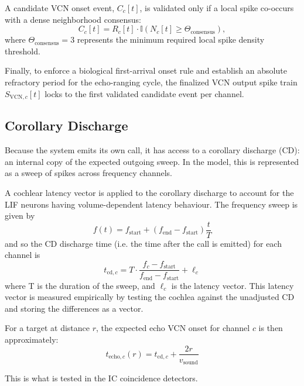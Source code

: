 A candidate VCN onset event, $C_c[t]$, is validated only if a local spike co-occurs with a dense neighborhood consensus:
\begin{equation}
    C_c[t] = R_c[t] \cdot \mathbb{I}\left(N_c[t] \geq \Theta_{\text{consensus}}\right),
\end{equation}
where $\Theta_{\text{consensus}} = 3$ represents the minimum required local spike density threshold.

Finally, to enforce a biological first-arrival onset rule and establish an absolute refractory period for the echo-ranging cycle, the finalized VCN output spike train $S_{\text{VCN}, c}[t]$ locks to the first validated candidate event per channel. 






\subsection{Corollary Discharge}

Because the system emits its own call, it has access to a corollary discharge (CD): an internal copy of the expected outgoing sweep. In the model, this is represented as a sweep of spikes across frequency channels. 

A cochlear latency vector is applied to the corollary discharge to account for the LIF neurons having volume-dependent latency behaviour. The frequency sweep is given by
\begin{equation}
    f(t) = f_{\text{start}} + (f_{\text{end}} - f_{\text{start}}) \frac{t}{T}
\end{equation}
and so the CD discharge time (i.e. the time after the call is emitted) for each channel is
\begin{equation}
    t_{\text{cd}, c} = T \cdot \frac{f_c - f_{\text{start}}}{f_{\text{end}} - f_{\text{start}}} + \ell_c
\end{equation}
where T is the duration of the sweep, and $\ell_c$ is the latency vector. This latency vector is measured empirically by testing the cochlea against the unadjusted CD and storing the differences as a vector.

For a target at distance $r$, the expected echo VCN onset for channel $c$ is then approximately:
\begin{equation}
t_{\text{echo},c}(r) = t_{\text{cd},c} + \frac{2r}{v_{\text{sound}}}
\end{equation}

This is what is tested in the IC coincidence detectors.

